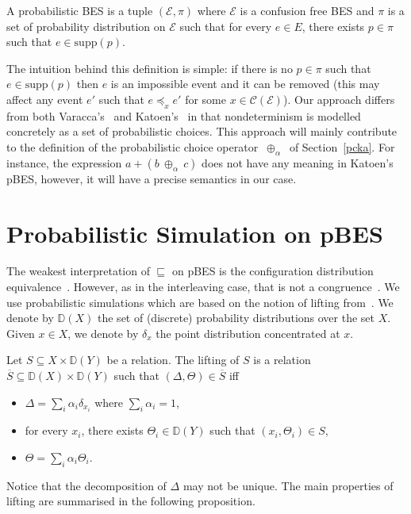 \documentclass{llncs}
\newcommand{\C}{\mathcal{C}}
\newcommand{\D}{\mathbb{D}}
\newcommand{\EE}{\mathcal{E}}
\newcommand{\refby}{\sqsubseteq}
\newcommand{\<}{\langle}
\renewcommand{\>}{\rangle}
\newcommand{\pc}[1]{{\ \oplus_{\!#1}\ }}
\newcommand{\supp}{\mathrm{supp}}
\newcommand{\ov}[1]{\overline{#1}}
\begin{document}
\begin{definition}
A probabilistic BES is a tuple $(\EE,\pi)$ where $\EE$ is a confusion free BES and $\pi$ is a set of probability distribution on $\EE$ such that for every $e\in E$, there exists $p\in\pi$ such that $e\in\supp(p)$.
\end{definition}

The intuition behind this definition is simple: if there is no $p\in\pi$ such that $e\in\supp(p)$ then $e$ is an impossible event and  it can be removed (this may affect any event $e'$ such that $e\preceq_x e'$ for some $x\in\C(\EE)$). Our approach differs from both Varacca's~\cite{Var03} and Katoen's~\cite{Kat96} in that nondeterminism is modelled concretely as a set of probabilistic choices. This approach will mainly contribute to the definition of the probabilistic choice operator $\pc{\alpha}$ of Section~\ref{pcka}. For instance, the expression $a+(b\pc{\alpha} c)$ does not have any meaning in Katoen's pBES, however, it will have a precise semantics in our case.


\section{Probabilistic Simulation on pBES}\label{simulation}

The weakest interpretation of $\refby$ on pBES is the configuration distribution equivalence~\cite{Var03}. However, as in the interleaving case, that is not a congruence~\cite{Seg95}. We use probabilistic simulations which are based on the notion of lifting from~\cite{Den07a}. We denote by $\D(X)$ the set of (discrete) probability distributions over the set $X$. Given $x\in X$, we denote by $\delta_x$ the point distribution concentrated at $x$.

Let $S\subseteq X\times\D(Y)$ be a relation. The lifting of $S$ is a relation $\ov{S}\subseteq \D(X)\times\D(Y)$ such that $(\Delta,\Theta)\in\ov{S}$ iff
\begin{itemize}
\item $\Delta = \sum_{i}\alpha_i\delta_{x_i}$ where $\sum_i\alpha_i = 1$,
\item for every $x_i$, there exists $\Theta_i\in\D(Y)$ such that $(x_i,\Theta_i)\in S$,
\item $\Theta = \sum_{i}\alpha_i\Theta_i$.
\end{itemize}

Notice that the decomposition of $\Delta$ may not be unique. The main properties of lifting are summarised in the following proposition.
\end{document}
